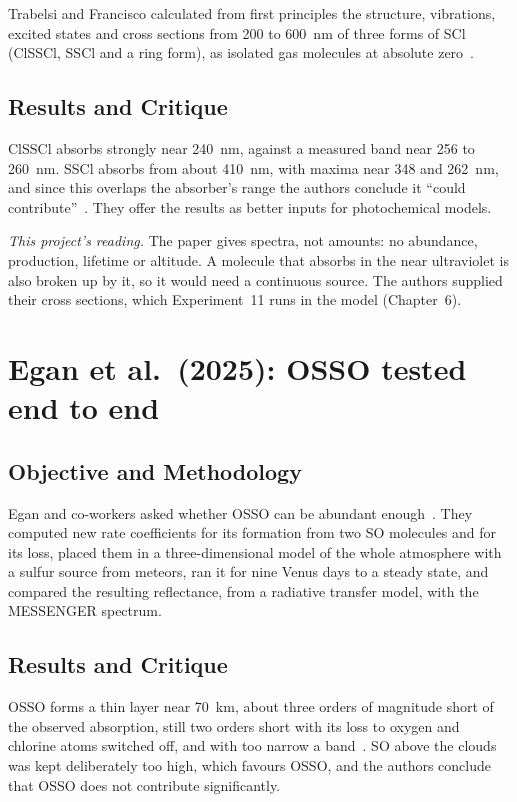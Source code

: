 Trabelsi and Francisco calculated from first principles the structure, vibrations,
excited states and cross sections from 200 to 600~nm of three forms of
SCl (ClSSCl, SSCl and a ring form), as isolated gas molecules at
absolute zero~\cite{trabelsi2026}.

\subsection{Results and Critique}

ClSSCl absorbs strongly near 240~nm, against a measured band near 256 to 260~nm.
SSCl absorbs from about 410~nm, with maxima near 348 and 262~nm, and since this
overlaps the absorber's range the authors conclude it ``could
contribute''~\cite{trabelsi2026}. They offer the results as better inputs for
photochemical models.

\emph{This project's reading.} The paper gives spectra, not amounts: no abundance,
production, lifetime or altitude. A molecule that absorbs in the near ultraviolet is also
broken up by it, so it would need a continuous source. The authors supplied their cross
sections, which Experiment~11 runs in the model (Chapter~6).

\section{Egan et al.\ (2025): OSSO tested end to end}
\label{sec:lit-osso}

\subsection{Objective and Methodology}

Egan and co-workers asked whether OSSO can be abundant enough~\cite{egan2025osso}. They
computed new rate coefficients for its formation from two SO molecules and for its loss,
placed them in a three-dimensional model of the whole atmosphere with a sulfur source from
meteors, ran it for nine Venus days to a steady state, and compared the resulting
reflectance, from a radiative transfer model, with the MESSENGER spectrum.

\subsection{Results and Critique}

OSSO forms a thin layer near 70~km, about three orders of magnitude short of the observed
absorption, still two orders short with its loss to oxygen and chlorine atoms switched
off, and with too narrow a band~\cite{egan2025osso}. SO above the clouds was kept
deliberately too high, which favours OSSO, and the authors conclude that OSSO does not
contribute significantly.

